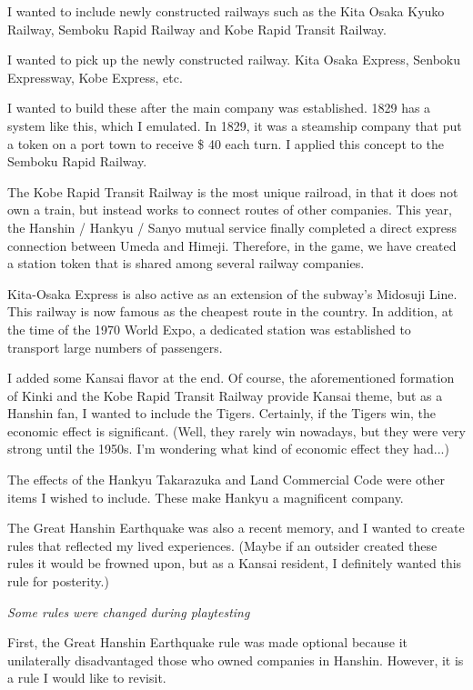 \begin{multicols}{2}
I wanted to include newly constructed railways such as the Kita Osaka
Kyuko Railway, Semboku Rapid Railway and Kobe Rapid Transit Railway.

I wanted to pick up the newly constructed railway. Kita Osaka Express,
Senboku Expressway, Kobe Express, etc.

I wanted to build these after the main company was established.  1829
has a system like this, which I emulated.  In 1829, it was a steamship
company that put a token on a port town to receive \$ 40 each turn.
I applied this concept to the Semboku Rapid Railway.

The Kobe Rapid Transit Railway is the most unique railroad, in that it
does not own a train, but instead works to connect routes of other
companies.  This year, the Hanshin / Hankyu / Sanyo mutual service
finally completed a direct express connection between Umeda and
Himeji. Therefore, in the game, we have created a station token that
is shared among several railway companies.

Kita-Osaka Express is also active as an extension of the subway's
Midosuji Line.  This railway is now famous as the cheapest route in
the country.  In addition, at the time of the 1970 World Expo, a
dedicated station was established to transport large numbers of
passengers.

I added some Kansai flavor at the end. Of course, the aforementioned
formation of Kinki and the Kobe Rapid Transit Railway provide Kansai
theme, but as a Hanshin fan, I wanted to include the
Tigers. Certainly, if the Tigers win, the economic effect is
significant. (Well, they rarely win nowadays, but they were very
strong until the 1950s. I'm wondering what kind of economic effect
they had...)

The effects of the Hankyu Takarazuka and Land Commercial Code were
other items I wished to include. These make Hankyu a magnificent
company.

The Great Hanshin Earthquake was also a recent memory, and I wanted to
create rules that reflected my lived experiences. (Maybe if an
outsider created these rules it would be frowned upon, but as a Kansai
resident, I definitely wanted this rule for posterity.)

\emph{Some rules were changed during playtesting}

First, the Great Hanshin Earthquake rule was made optional because it
unilaterally disadvantaged those who owned companies in
Hanshin. However, it is a rule I would like to revisit.


\end{multicols}
